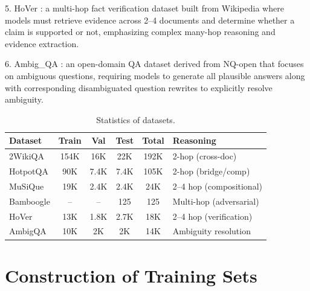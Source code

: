 5. HoVer \citep{jiang2020hover}: a multi-hop fact verification dataset built from Wikipedia where models must retrieve evidence across 2–4 documents and determine whether a claim is supported or not, emphasizing complex many-hop reasoning and evidence extraction. 

6. Ambig\_QA \citep{min-etal-2020-ambigqa}: an open-domain QA dataset derived from NQ-open that focuses on ambiguous questions, requiring models to generate all plausible answers along with corresponding disambiguated question rewrites to explicitly resolve ambiguity.

\vspace{10pt}
\begin{table}[h]
\centering
\caption{Statistics of datasets.}
\label{tab:dataset_stats}
\begin{tabularx}{\columnwidth}{lccccX}
\toprule
\textbf{Dataset} & \textbf{Train} & \textbf{Val} & \textbf{Test} & \textbf{Total} & \textbf{Reasoning} \\
\midrule
2WikiQA & 154K & 16K & 22K & 192K & 2-hop (cross-doc) \\
HotpotQA        & 90K  & 7.4K & 7.4K & 105K & 2-hop (bridge/comp) \\
MuSiQue         & 19K  & 2.4K & 2.4K & 24K  & 2--4 hop (compositional) \\
Bamboogle       & --   & --   & 125  & 125  & Multi-hop (adversarial) \\
HoVer           & 13K  & 1.8K & 2.7K & 18K  & 2--4 hop (verification) \\
AmbigQA         & 10K  & 2K   & 2K   & 14K  & Ambiguity resolution \\
\bottomrule
\end{tabularx}
\end{table}


\section{Construction of Training Sets}
\label{app:training_set}


